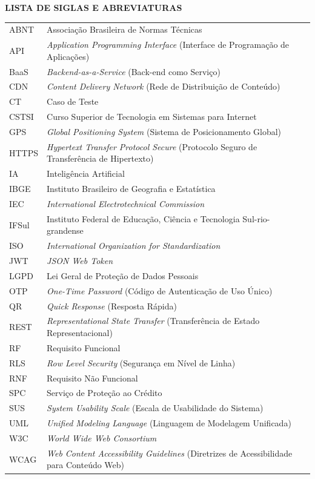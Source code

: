 \thispagestyle{empty}
\begin{center}
    \textbf{\large LISTA DE SIGLAS E ABREVIATURAS}
\end{center}
\vspace{0.8cm}

\begin{singlespacing}
\noindent
\begin{longtable}{p{3.5cm} p{11.5cm}}
ABNT & Associação Brasileira de Normas Técnicas \\
API & \textit{Application Programming Interface} (Interface de Programação de Aplicações) \\
BaaS & \textit{Backend-as-a-Service} (Back-end como Serviço) \\
CDN & \textit{Content Delivery Network} (Rede de Distribuição de Conteúdo) \\
CT & Caso de Teste \\
CSTSI & Curso Superior de Tecnologia em Sistemas para Internet \\
GPS & \textit{Global Positioning System} (Sistema de Posicionamento Global) \\
HTTPS & \textit{Hypertext Transfer Protocol Secure} (Protocolo Seguro de Transferência de Hipertexto) \\
IA & Inteligência Artificial \\
IBGE & Instituto Brasileiro de Geografia e Estatística \\
IEC & \textit{International Electrotechnical Commission} \\
IFSul & Instituto Federal de Educação, Ciência e Tecnologia Sul-rio-grandense \\
ISO & \textit{International Organization for Standardization} \\
JWT & \textit{JSON Web Token} \\
LGPD & Lei Geral de Proteção de Dados Pessoais \\
OTP & \textit{One-Time Password} (Código de Autenticação de Uso Único) \\
QR & \textit{Quick Response} (Resposta Rápida) \\
REST & \textit{Representational State Transfer} (Transferência de Estado Representacional) \\
RF & Requisito Funcional \\
RLS & \textit{Row Level Security} (Segurança em Nível de Linha) \\
RNF & Requisito Não Funcional \\
SPC & Serviço de Proteção ao Crédito \\
SUS & \textit{System Usability Scale} (Escala de Usabilidade do Sistema) \\
UML & \textit{Unified Modeling Language} (Linguagem de Modelagem Unificada) \\
W3C & \textit{World Wide Web Consortium} \\
WCAG & \textit{Web Content Accessibility Guidelines} (Diretrizes de Acessibilidade para Conteúdo Web) \\
\end{longtable}
\end{singlespacing}

\clearpage

